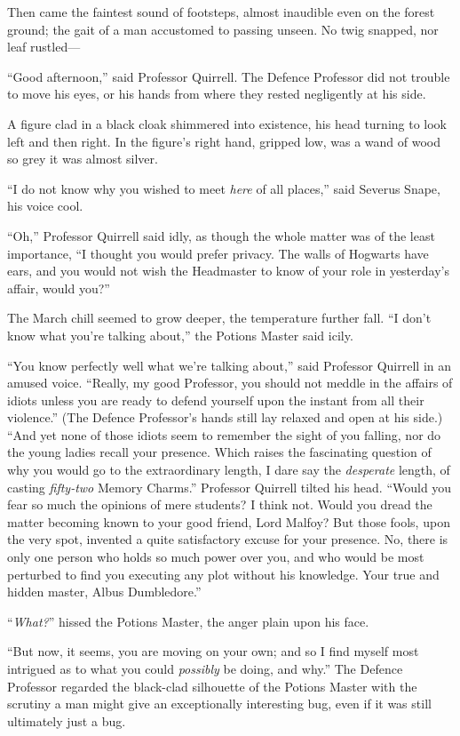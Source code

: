 Then came the faintest sound of footsteps, almost inaudible even on the forest
ground; the gait of a man accustomed to passing unseen. No twig snapped, nor
leaf rustled—

“Good afternoon,” said Professor Quirrell. The Defence Professor did not
trouble to move his eyes, or his hands from where they rested negligently at
his side.

A figure clad in a black cloak shimmered into existence, his head turning to
look left and then right. In the figure’s right hand, gripped low, was a wand
of wood so grey it was almost silver.

“I do not know why you wished to meet \emph{here} of all places,” said Severus
Snape, his voice cool.

“Oh,” Professor Quirrell said idly, as though the whole matter was of the least
importance, “I thought you would prefer privacy. The walls of Hogwarts have
ears, and you would not wish the Headmaster to know of your role in yesterday’s
affair, would you?”

The March chill seemed to grow deeper, the temperature further fall. “I don’t
know what you’re talking about,” the Potions Master said icily.

“You know perfectly well what we’re talking about,” said Professor Quirrell in
an amused voice. “Really, my good Professor, you should not meddle in the
affairs of idiots unless you are ready to defend yourself upon the instant from
all their violence.” (The Defence Professor’s hands still lay relaxed and open
at his side.) “And yet none of those idiots seem to remember the sight of you
falling, nor do the young ladies recall your presence. Which raises the
fascinating question of why you would go to the extraordinary length, I dare
say the \emph{desperate} length, of casting \emph{fifty-two} Memory Charms.”
Professor Quirrell tilted his head. “Would you fear so much the opinions of
mere students? I think not. Would you dread the matter becoming known to your
good friend, Lord Malfoy? But those fools, upon the very spot, invented a quite
satisfactory excuse for your presence. No, there is only one person who holds
so much power over you, and who would be most perturbed to find you executing
any plot without his knowledge. Your true and hidden master, Albus Dumbledore.”

“\emph{What?}” hissed the Potions Master, the anger plain upon his face.

“But now, it seems, you are moving on your own; and so I find myself most
intrigued as to what you could \emph{possibly} be doing, and why.” The Defence
Professor regarded the black-clad silhouette of the Potions Master with the
scrutiny a man might give an exceptionally interesting bug, even if it was
still ultimately just a bug.

